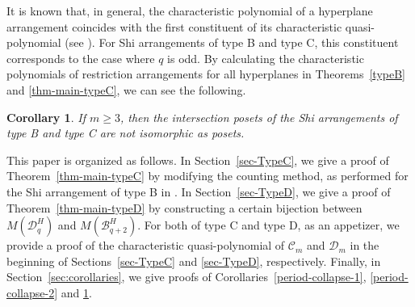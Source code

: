 \documentclass{article}
\theoremstyle{plain}
\newtheorem{Cor}[Them]{Corollary}
\theoremstyle{definition}
\theoremstyle{remark}
\newtheorem{rem}[Them]{Remark}
\numberwithin{equation}{section}
\newcommand{\Bc}{\mathcal{B}}
\newcommand{\Cc}{\mathcal{C}}
\newcommand{\Dc}{\mathcal{D}}
\begin{document}
It is known that, in general, the characteristic polynomial of a hyperplane arrangement coincides with the first constituent of its characteristic quasi-polynomial (see \cite[Theorem 2.1]{Athanasiadis1999}).
For Shi arrangements of type B and type C, this constituent corresponds to the case where $q$ is odd.
By calculating the characteristic polynomials of restriction arrangements for all hyperplanes in Theorems~\ref{typeB} and \ref{thm-main-typeC}, we can see the following.
\begin{Cor}\label{Cor-latticeBC}
   If $m \geq 3$, then the intersection posets of the Shi arrangements of type B and type C are not isomorphic as posets.
\end{Cor}


\medskip

This paper is organized as follows. 
In Section~\ref{sec-TypeC}, we give a proof of Theorem~\ref{thm-main-typeC} by modifying the counting method, as performed for the Shi arrangement of type B in \cite{HN2024}. 
In Section~\ref{sec-TypeD}, we give a proof of Theorem~\ref{thm-main-typeD} by constructing a certain bijection between $M(\Dc_q^H)$ and $M(\Bc_{q+2}^H)$. 
For both of type C and type D, as an appetizer, we provide a proof of the characteristic quasi-polynomial of $\Cc_m$ and $\Dc_m$ in the beginning of Sections~\ref{sec-TypeC} and \ref{sec-TypeD}, respectively. 
Finally, in Section~\ref{sec:corollaries}, we give proofs of Corollaries~\ref{period-collapse-1}, \ref{period-collapse-2} and \ref{Cor-latticeBC}. 
\end{document}
